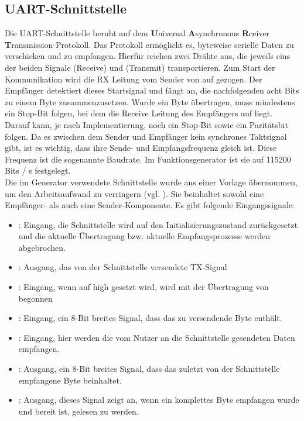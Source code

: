 \subsection{UART-Schnittstelle}
Die UART-Schnittstelle beruht auf dem \textbf{U}niversal \textbf{A}synchronous \textbf{R}ceiver \textbf{T}ransmission-Protokoll.
Das Protokoll ermöglicht es, byteweise serielle Daten zu verschicken und zu empfangen.
Hierfür reichen zwei Drähte aus, die jeweils eins der beiden Signale  (Receive) und  (Transmit) transportieren.
Zum Start der Kommunikation wird die RX Leitung vom Sender von  auf  gezogen.
Der Empfänger detektiert dieses Startsignal und fängt an, die nachfolgenden acht Bits zu einem Byte zusammenzusetzen.
Wurde ein Byte übertragen, muss mindestens ein Stop-Bit folgen, bei dem die Receive Leitung des Empfängers auf  liegt.
Darauf kann, je nach Implementierung, noch ein Stop-Bit sowie ein Paritätsbit folgen.
Da es zwischen dem Sender und Empfänger kein synchrones Taktsignal gibt, ist es wichtig, dass ihre Sende- und Empfangsfrequenz gleich ist.
Diese Frequenz ist die sogenannte Baudrate.
Im Funktionsgenerator ist sie auf 115200 Bits / s festgelegt. \\
Die im Generator verwendete Schnittstelle wurde aus einer Vorlage übernommen, um den Arbeitsaufwand zu verringern (vgl. \cite{digilent2020}).
Sie beinhaltet sowohl eine Empfänger- als auch eine Sender-Komponente.
Es gibt folgende Eingangssignale:
\begin{itemize}
\item {}: Eingang, die Schnittstelle wird auf den Initialisierungszustand zurückgesetzt und die aktuelle Übertragung bzw. aktuelle Empfangsprozesse werden abgebrochen.

\item {}: Ausgang, das von der Schnittstelle versendete TX-Signal 
  \item {}: Eingang, wenn  auf high gesetzt wird, wird mit der Übertragung von  begonnen
\item {}: Eingang, ein 8-Bit breites Signal, dass das zu versendende Byte enthält.

\item {}: Eingang, hier werden die vom Nutzer an die Schnittstelle gesendeten Daten empfangen.
\item {}: Ausgang, ein 8-Bit breites Signal, dass das zuletzt von der Schnittstelle empfangene Byte beinhaltet.
\item {}: Ausgang, dieses Signal zeigt an, wenn ein komplettes Byte empfangen wurde und bereit ist, gelesen zu werden.
\end{itemize}
  
